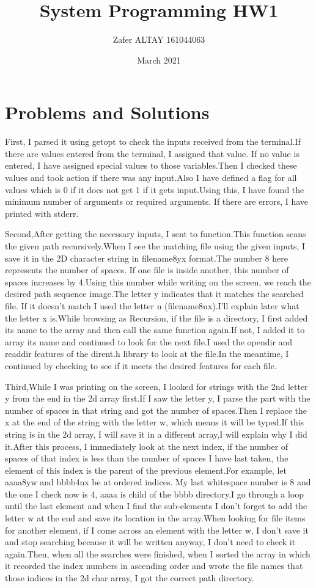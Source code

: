 \documentclass{article}
\title{System Programming HW1}
\author{Zafer ALTAY 161044063 }
\date{March 2021}
\begin{document}
\maketitle

\section{Problems and Solutions}
First, I parsed it using getopt to check the inputs received from the terminal.If there are values entered from the terminal, I assigned that value. If no value is entered, I have assigned special values to those variables.Then I checked these values and took action if there was any input.Also I have defined a flag for all values which is 0 if it does not get 1 if it gets input.Using this, I have found the minimum number of arguments or required arguments. If there are errors, I have printed with stderr.

Second,After getting the necessary inputs, I sent to function.This function scans the given path recursively.When I see the matching file using the given inputs, I save it in the 2D character string in filename8yx format.The number 8 here represents the number of spaces. If one file is inside another, this number of spaces increases by 4.Using this number while writing on the screen, we reach the desired path sequence image.The letter y indicates that it matches the searched file. If it doesn't match I used the letter n (filename8nx).I'll explain later what the letter x is.While browsing as Recursion, if the file is a directory, I first added its name to the array and then call the same function again.If not, I added it to array its name and continued to look for the next file.I used the opendir and readdir features of the dirent.h library to look at the file.In the meantime, I continued by checking to see if it meets the desired features for each file.

Third,While I was printing on the screen, I looked for strings with the 2nd letter y from the end in the 2d array first.If I saw the letter y, I parse the part with the number of spaces in that string and got the number of spaces.Then I replace the x at the end of the string with the letter w, which means it will be typed.If this string is in the 2d array, I will save it in a different array,I will explain why I did it.After this process, I immediately look at the next index, if the number of spaces of that index is less than the number of spaces I have last taken, the element of this index is the parent of the previous element.For example, let aaaa8yw and bbbb4nx be at ordered indices. My last whitespace number is 8 and the one I check now is 4, aaaa is child of the bbbb directory.I go through a loop until the last element and when I find the sub-elements I don't forget to add the letter w at the end and save its location in the array.When looking for file items for another element, if I come across an element with the letter w, I don't save it and stop searching because it will be written anyway, I don't need to check it again.Then, when all the searches were finished, when I sorted the array in which it recorded the index numbers in ascending order and wrote the file names that those indices in the 2d char array, I got the correct path directory.
\end{document}
